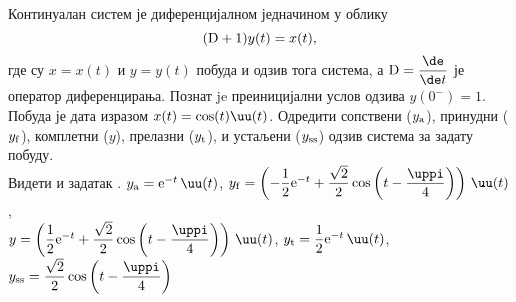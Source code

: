 \PID
Континуалан 
систем је 
диференцијалном једначином у облику 
$$
({\rm D} + 1) y(t) = x(t),
$$ где су 
$x = x(t)$ и $y = y(t)$ побуда и одзив 
тога система, а 
${\rm D} = \dfrac{\de}{\de t}$ је 
оператор диференцирања. 
Познат je преиницијални услов 
одзива $y(0^-) = 1$.
Побуда је дата изразом 
$x(t) = \cos(t) \uu(t)$. Одредити сопствени
($y_{\rm a}$), 
принудни
($y_{\rm f}$), 
комплетни
($y$), 
прелазни
($y_{\rm t}$),
 и устаљени
($y_{\rm ss}$) одзив система за задату побуду.
\\[2mm]

\REZULTAT  Видети и задатак .
$y_{\rm a} = {\rm e}^{-t} \, \uu(t)$, 
$y_{\rm f} = 
\left( 
-\dfrac{1}{2} {\rm e}^{-t} 
+ \dfrac{\sqrt 2}{2} 
\cos
\left(
t - \dfrac{\uppi}{4}
\right)
\right)\,\uu(t)$, \\
$y = 
\left( 
\dfrac{1}{2} {\rm e}^{-t} 
+ \dfrac{\sqrt 2}{2} 
\cos
\left(
t - \dfrac{\uppi}{4}
\right)
\right)\,\uu(t)
$, 
$
y_{\rm t} = 
\dfrac{1}{2} {\rm e}^{-t} \, \uu(t)
$,
$y_{\rm ss} = 
\dfrac{\sqrt 2}{ 2} 
\cos
\left(
t - \dfrac{\uppi}{4}
\right)
$
